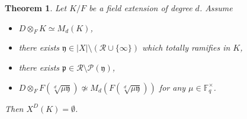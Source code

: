\documentclass[10pt]{amsart}
\theoremstyle{plain}
\newtheorem{thm}{Theorem}[section]
\theoremstyle{definition}
\newcommand{\cP}{\mathcal{P}}
\newcommand{\cR}{\mathcal{R}}
\newcommand{\bF}{\mathbb{F}}
\newcommand{\frp}{\mathfrak{p}}
\newcommand{\fry}{\mathfrak{y}}
\begin{document}
\begin{thm}\label{ThmNonExistSplit}
	Let $K/F$ be a field extension of degree $d$. Assume
	\begin{itemize}
		\item $D\otimes_F K\simeq M_d(K)$,
		\item there exists $\fry\in |X|\setminus(\cR\cup\{\infty\})$ which totally ramifies in $K$, 
		\item there exists $\frp\in \cR\setminus \cP(\fry)$,
		\item $D\otimes_F F(\sqrt[d]{\mu\fry})\not\simeq M_d(F(\sqrt[d]{\mu\fry}))$ for any $\mu\in \bF_q^\times$.
	\end{itemize} 
Then $X^D(K)=\emptyset$.
\end{thm}
\end{document}
